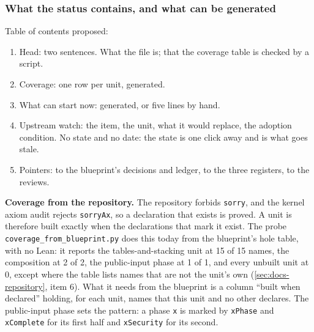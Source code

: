 \subsubsection{What the status contains, and what can be generated}\label{sec:docs-status-contents}

Table of contents proposed:

\begin{enumerate}
\item Head: two sentences. What the file is; that the coverage table is checked by a script.
\item Coverage: one row per unit, generated.
\item What can start now: generated, or five lines by hand.
\item Upstream watch: the item, the unit, what it would replace, the adoption condition. No state and no date: the state is one click away and is what goes stale.
\item Pointers: to the blueprint's decisions and ledger, to the three registers, to the reviews.
\end{enumerate}

\begin{sloppypar}
\textbf{Coverage from the repository.} The repository forbids \texttt{sorry}, and the kernel axiom audit rejects \texttt{sorryAx}, so a declaration that exists is proved. A unit is therefore built exactly when the declarations that mark it exist. The probe \texttt{coverage\_\allowbreak{}from\_\allowbreak{}blueprint.\allowbreak{}py} does this today from the blueprint's hole table, with no Lean: it reports the tables-and-stacking unit at 15 of 15 names, the composition at 2 of 2, the public-input phase at 1 of 1, and every unbuilt unit at 0, except where the table lists names that are not the unit's own (\cref{sec:docs-repository}, item 6). What it needs from the blueprint is a column ``built when declared'' holding, for each unit, names that this unit and no other declares. The public-input phase sets the pattern: a phase \texttt{x} is marked by \texttt{xPhase} and \texttt{xComplete} for its first half and \texttt{xSecurity} for its second.
\end{sloppypar}

